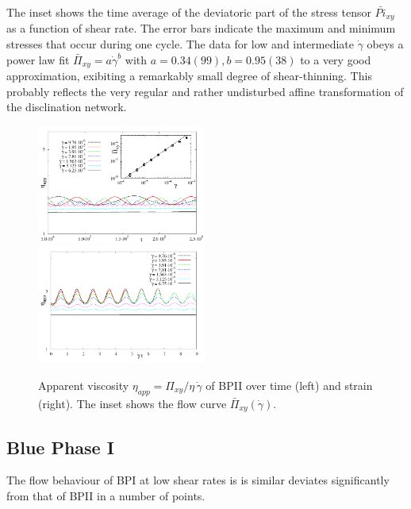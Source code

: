 \documentclass[aps,pre,reprint,superscriptaddress]{revtex4}
\newcommand{\gd}{\dot{\gamma}}
\begin{document}
The inset shows the time average of the deviatoric part of the stress tensor $\bar{Pi}_{xy}$ as a function of shear rate.
The error bars indicate the maximum and minimum stresses that occur during one cycle.
The data for low and intermediate $\gd$ obeys a power law fit $\bar{\Pi}_{xy}=a \gd^b$ with $a=0.34(99), b=0.95(38)$ to
a very good approximation, exibiting a remarkably small degree of shear-thinning.
This probably reflects the very regular and rather undisturbed affine transformation of the disclination network.  

\begin{figure}[h]
\includegraphics[width=0.495\textwidth]{stress_bp2.pdf}
\includegraphics[width=0.495\textwidth]{stress_vs_strain_bp2.pdf}
\caption{Apparent viscosity $\eta_{app}=\Pi_{xy}/\eta\,\gd$ of BPII over time (left) and strain (right). The inset shows the flow curve $\bar{\Pi}_{xy}(\gd)$.}
\label{bp2-rheo}
\end{figure}

\clearpage

\subsection{Blue Phase I}



The flow behaviour of BPI at low shear rates is is similar deviates significantly from that of BPII in a number of points.
\end{document}
